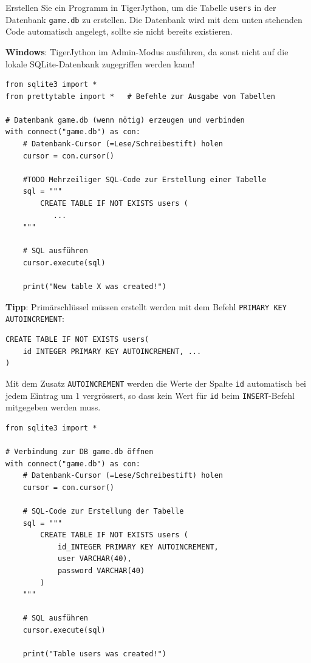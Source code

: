 \begin{myexercise}

Erstellen Sie ein Programm in TigerJython, um die Tabelle \texttt{users} in der Datenbank \texttt{game.db} zu erstellen. Die Datenbank wird mit dem unten stehenden Code automatisch angelegt, sollte sie nicht bereits existieren.
\begin{myattention}
\faWindows{} \textbf{Windows}: TigerJython im Admin-Modus ausführen, da sonst nicht auf die lokale SQLite-Datenbank zugegriffen werden kann!
\end{myattention}

\begin{lstlisting}
from sqlite3 import *
from prettytable import *   # Befehle zur Ausgabe von Tabellen

# Datenbank game.db (wenn nötig) erzeugen und verbinden
with connect("game.db") as con:
    # Datenbank-Cursor (=Lese/Schreibestift) holen
    cursor = con.cursor()
    
    #TODO Mehrzeiliger SQL-Code zur Erstellung einer Tabelle
    sql = """
        CREATE TABLE IF NOT EXISTS users (
           ...
    """
    
    # SQL ausführen
    cursor.execute(sql)

    print("New table X was created!")

\end{lstlisting}

\textbf{Tipp}: Primärschlüssel müssen erstellt werden mit dem Befehl \lstinline[style=sql]|PRIMARY KEY AUTOINCREMENT|:
\begin{lstlisting}[style=sql]
CREATE TABLE IF NOT EXISTS users(
	id INTEGER PRIMARY KEY AUTOINCREMENT, ...
)
\end{lstlisting}
Mit dem Zusatz \lstinline[style=sql]|AUTOINCREMENT| werden die Werte der Spalte \texttt{id} automatisch bei jedem Eintrag um 1 vergrössert, so dass kein Wert für \texttt{id} beim \lstinline[style=sql]|INSERT|-Befehl mitgegeben werden muss.
\begin{myanswer}
\begin{lstlisting}
from sqlite3 import *

# Verbindung zur DB game.db öffnen
with connect("game.db") as con:
    # Datenbank-Cursor (=Lese/Schreibestift) holen
    cursor = con.cursor()
    
    # SQL-Code zur Erstellung der Tabelle
    sql = """
        CREATE TABLE IF NOT EXISTS users (
            id_INTEGER PRIMARY KEY AUTOINCREMENT,
            user VARCHAR(40),
            password VARCHAR(40) 
        )
    """
    
    # SQL ausführen
    cursor.execute(sql)

    print("Table users was created!")
\end{lstlisting}
\end{myanswer}
\end{myexercise}



